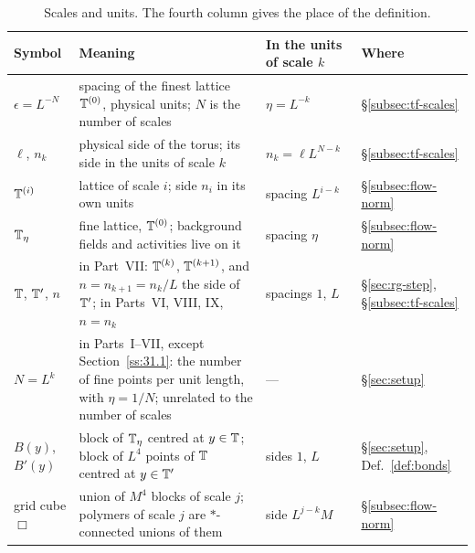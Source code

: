 \begin{table}[tbp]
\centering\small
\renewcommand{\arraystretch}{1.15}
\begin{tabular}{|p{}|p{}|p{}|p{}|}
\hline
Symbol & Meaning & In the units of scale $k$ & Where\tabularnewline
\hline
$\epsilon=L^{-N}$ & \raggedright spacing of the finest lattice $\mathbb T^{(0)}$, physical units; $N$ is the number of scales & $\eta=L^{-k}$ & \S\ref{subsec:tf-scales}\tabularnewline
$\ell$, $n_k$ & \raggedright physical side of the torus; its side in the units of scale $k$ & $n_k=\ell L^{N-k}$ & \S\ref{subsec:tf-scales}\tabularnewline
$\mathbb T^{(i)}$ & \raggedright lattice of scale $i$; side $n_i$ in its own units & spacing $L^{i-k}$ & \S\ref{subsec:flow-norm}\tabularnewline
$\mathbb T_\eta$ & \raggedright fine lattice, $\mathbb T^{(0)}$; background fields and activities live on it & spacing $\eta$ & \S\ref{subsec:flow-norm}\tabularnewline
$\mathbb T$, $\mathbb T'$, $n$ & \raggedright in Part~VII: $\mathbb T^{(k)}$, $\mathbb T^{(k+1)}$, and $n=n_{k+1}=n_k/L$ the side of $\mathbb T'$; in Parts~VI, VIII, IX, $n=n_k$ & spacings $1$, $L$ & \S\ref{sec:rg-step}, \S\ref{subsec:tf-scales}\tabularnewline
$N=L^k$ & \raggedright in Parts~I--VII, except Section~\ref{ss:31.1}: the number of fine points per unit length, with $\eta=1/N$; unrelated to the number of scales & --- & \S\ref{sec:setup}\tabularnewline
$B(y)$, $B'(y)$ & \raggedright block of $\mathbb T_\eta$ centred at $y\in\mathbb T$; block of $L^4$ points of $\mathbb T$ centred at $y\in\mathbb T'$ & sides $1$, $L$ & \S\ref{sec:setup}, Def.~\ref{def:bonds}\tabularnewline
grid cube $\Box$ & \raggedright union of $M^4$ blocks of scale $j$; polymers of scale $j$ are $*$-connected unions of them & side $L^{j-k}M$ & \S\ref{subsec:flow-norm}\tabularnewline
\hline
\end{tabular}
\caption{Scales and units. The fourth column gives the place of the definition.}\label{tab:G-scales}
\end{table}


